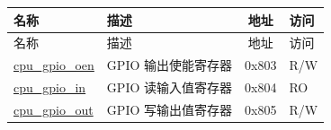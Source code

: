 \begin{longtable}{ | p{4.0cm} | p{8.4cm} | c | l | }
\hline\rowcolor{lightgray}
名称 & 描述 & 地址 & 访问 \\ \hline
\endfirsthead
\hline
\rowcolor{lightgray}
名称 & 描述 & 地址 & 访问 \\
\hline
\endhead
\endfoot
\hyperref[regdesc:GPIO_OEN]{cpu\_gpio\_oen} & GPIO 输出使能寄存器 & 0x803 & R/W \\\hline
\hyperref[regdesc:GPIO_IN]{cpu\_gpio\_in} & GPIO 读输入值寄存器 & 0x804 & RO \\\hline
\hyperref[regdesc:GPIO_OUT]{cpu\_gpio\_out} & GPIO 写输出值寄存器 & 0x805 & R/W \\\hline
\end{longtable}
